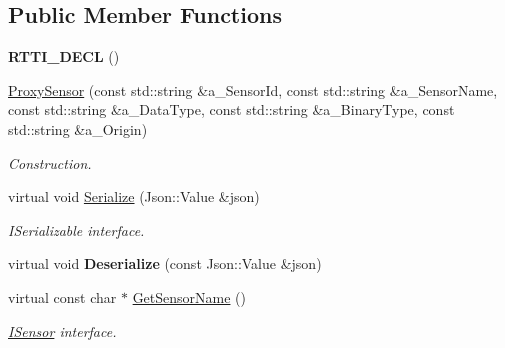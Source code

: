 \subsection*{Public Member Functions}
\begin{DoxyCompactItemize}
\item 
\mbox{\label{class_proxy_sensor_addf8ddb9d8ecd97b9cb83a7fbc0261b3}} 
{\bfseries R\+T\+T\+I\+\_\+\+D\+E\+CL} ()
\item 
\mbox{\label{class_proxy_sensor_ad3bb6b93878eb3d9a92f8c327300cbff}} 
\hyperlink{class_proxy_sensor_ad3bb6b93878eb3d9a92f8c327300cbff}{Proxy\+Sensor} (const std\+::string \&a\+\_\+\+Sensor\+Id, const std\+::string \&a\+\_\+\+Sensor\+Name, const std\+::string \&a\+\_\+\+Data\+Type, const std\+::string \&a\+\_\+\+Binary\+Type, const std\+::string \&a\+\_\+\+Origin)
\begin{DoxyCompactList}\small\item\em Construction. \end{DoxyCompactList}\item 
\mbox{\label{class_proxy_sensor_a9e06df766f08165c019e821fc7a7bde9}} 
virtual void \hyperlink{class_proxy_sensor_a9e06df766f08165c019e821fc7a7bde9}{Serialize} (Json\+::\+Value \&json)
\begin{DoxyCompactList}\small\item\em I\+Serializable interface. \end{DoxyCompactList}\item 
\mbox{\label{class_proxy_sensor_a9b2c01e09d5b0e9a915aa9bac7569cd2}} 
virtual void {\bfseries Deserialize} (const Json\+::\+Value \&json)
\item 
\mbox{\label{class_proxy_sensor_aaa5099e5aadf1f13105ceeaeb2198a32}} 
virtual const char $\ast$ \hyperlink{class_proxy_sensor_aaa5099e5aadf1f13105ceeaeb2198a32}{Get\+Sensor\+Name} ()
\begin{DoxyCompactList}\small\item\em \hyperlink{class_i_sensor}{I\+Sensor} interface. \end{DoxyCompactList}\item 
\mbox{\label{class_proxy_sensor_a2fdcc6ed33f40dd5d48c96dd05eb81ec}} 

\end{DoxyCompactItemize}
